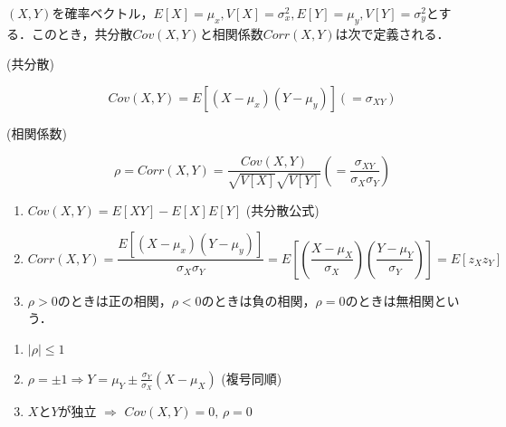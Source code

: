 \documentclass{jsreport}
\begin{document}
\begin{screen}
  \begin{defi}[共分散と相関係数]
    $(X, Y)$を確率ベクトル，$E[X] = \mu_x, V[X] = \sigma_x^2, E[Y] = \mu_y, V[Y] = \sigma_y^2$とする．このとき，共分散$Cov(X, Y)$と相関係数$Corr(X, Y)$は次で定義される．
    \begin{description}
      \item[(共分散)]
      \begin{equation}
        Cov(X, Y) = E[(X - \mu_x)(Y - \mu_y)] (= \sigma_{XY}) \nonumber
      \end{equation}
      \item[(相関係数)]
      \begin{equation}
        \rho = Corr(X, Y) = \frac{Cov(X, Y)}{\sqrt{V[X]}\sqrt{V[Y]}} \left( = \frac{\sigma_{XY}}{\sigma_X \sigma_Y}\right) \nonumber
      \end{equation}
    \end{description}
  \end{defi}
\end{screen}

\begin{enumerate}
  \item $Cov(X, Y) = E[XY] - E[X]E[Y]$ (共分散公式)
  \item
  \begin{equation}
    Corr(X, Y) = \frac{E[(X - \mu_x)(Y - \mu_y)]}{\sigma_X \sigma_Y} = E\left[\left(\frac{X - \mu_X}{\sigma_X}\right) \left(\frac{Y - \mu_Y}{\sigma_Y}\right)\right] = E[z_X z_Y] \nonumber
  \end{equation}
  \item $\rho > 0$のときは正の相関，$\rho < 0$のときは負の相関，$\rho = 0$のときは無相関という．
\end{enumerate}

\begin{screen}
  \begin{theo}\label{theo:joint}
    \begin{enumerate}
      \item $|\rho| \leq 1$
      \item $\rho = \pm 1 \Longrightarrow Y = \mu_Y \pm \frac{\sigma_Y}{\sigma_X} (X - \mu_X)$ (複号同順)
      \item $X$と$Y$が独立 $\Longrightarrow$ $Cov(X, Y) = 0, \, \rho = 0$
    \end{enumerate}
  \end{theo}
\end{screen}
\end{document}
